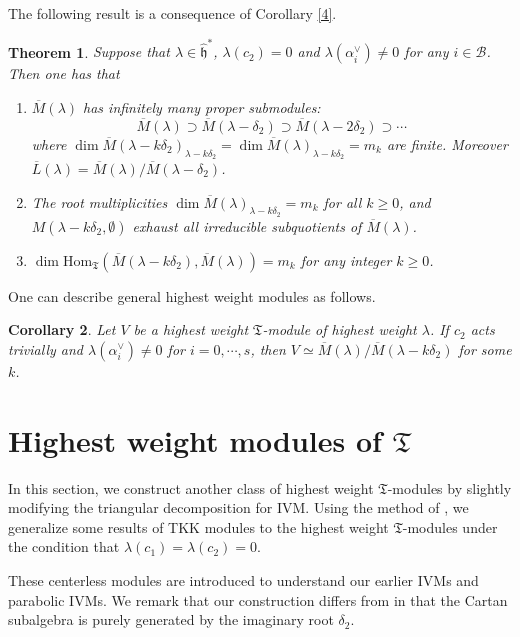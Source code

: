 \documentclass[11pt]{amsproc}
\newtheorem{theorem}{Theorem}[section]
\newtheorem{corollary}[theorem]{Corollary}
\theoremstyle{definition}
\theoremstyle{remark}
\numberwithin{equation}{section} \errorcontextlines=0
\begin{document}
The following result is a consequence of Corollary \ref{4}.
\begin{theorem}
Suppose that $\lambda\in\hat{\mathfrak h}^{\ast}$, $\lambda(c_2)=0$ and
$\lambda(\alpha_i^{\vee})\neq 0$ for any $i\in \mathcal {B}$. Then one has that
\begin{enumerate}
\item $\overline{M}(\lambda)$ has infinitely many proper submodules:
\begin{equation*}
\overline{M}(\lambda)\supset\overline{M}(\lambda-\delta_2)\supset\overline{M}(\lambda-2\delta_2)\supset\cdots
\end{equation*}
where $\dim\overline{M}(\lambda-k\delta_2)_{\lambda-k\delta_2}=
\dim \overline{M}(\lambda)_{\lambda-k\delta_2}=m_k$
are finite. Moreover
$\overline{L}(\lambda)=\overline{M}(\lambda)/\overline{M}(\lambda-\delta_2)$.

\item The root multiplicities $\dim
\overline{M}({\lambda})_{\lambda-k\delta_2}=m_k$ for all
$k\geq 0$, and $M(\lambda-k\delta_2,\emptyset)$ exhaust all
irreducible subquotients of $\overline{M}(\lambda)$.

\item $\dim\text{Hom}_{\mathfrak T}(\overline{M}(\lambda-k\delta_2),\overline{M}(\lambda))=m_k$
for any integer $k\geq 0$.
\end{enumerate}
\end{theorem}

One can describe general highest weight modules as follows.
\begin{corollary}
Let $V$ be a highest weight $\mathfrak T$-module of highest weight
$\lambda$. If $c_2$ acts trivially and $\lambda(\alpha_i^{\vee})\neq
0$ for $i=0, \cdots, s$, then $V\simeq
\overline{M}(\lambda)/\overline{M}(\lambda-k\delta_2)$ for some $k$.
\end{corollary}

\section{Highest weight modules of $\mathfrak T$}
In this section, we construct another class of highest weight
$\mathfrak T$-modules by slightly modifying the triangular
decomposition for IVM. Using the method of \cite{CT}, we generalize
some results of TKK modules to the highest weight $\mathfrak
T$-modules under the condition that ${\lambda}(c_1)={\lambda}(c_2)=0$.

These centerless modules are introduced to understand our earlier
IVMs and parabolic IVMs. We remark that our construction differs
from \cite{SE2, SE1} in that the Cartan subalgebra is purely
generated by the imaginary root $\delta_2$.
\end{document}
